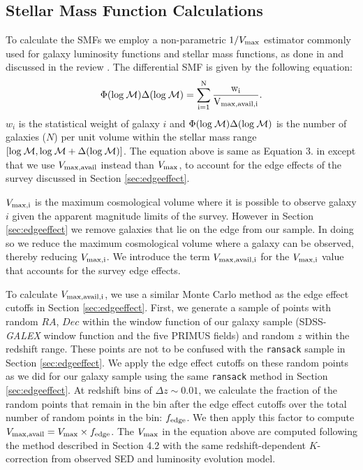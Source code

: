 \documentclass{emulateapj}
\begin{document}
\subsection{Stellar Mass Function Calculations} \label{sec:smfcalc} 
To calculate the SMFs we employ a non-parametric $1/{V_{\rm{max}}}$ estimator commonly used for galaxy luminosity functions and stellar mass functions, as done in \cite{Moustakas:2013aa} and discussed in the review \cite{Johnston:2011aa}. The differential SMF is given by the following equation:
\begin{equation} \label{eq:phi}
\Phi(\rm{log}\: \mathcal{M}) \Delta(\rm{log} \:\mathcal{M}) = \sum\limits_{i=1}^{N} \frac{w_i}{V_{\rm{max,avail},i}}. 
\end{equation}
$w_i$ is the statistical weight of galaxy $i$ and $\Phi(\rm{log}\: \mathcal{M}) \Delta(\rm{log}\: \mathcal{M})$ is the number of galaxies ($N$) per unit volume within the stellar mass range $[\rm{log} \:\mathcal{M}, \rm{log} \:\mathcal{M}+\Delta(\rm{log} \:\mathcal{M})]$. The equation above is same as Equation 3. in \cite{Moustakas:2013aa} except that we use $V_{\rm{max,avail}}$ instead than $V_{\rm{max}}$, to account for the edge effects of the survey discussed in Section \ref{sec:edgeeffect}. 

$V_{\rm{max},i}$ is the maximum cosmological volume where it is possible to observe galaxy $i$ given the apparent magnitude limits of the survey. However in Section \ref{sec:edgeeffect} we remove galaxies that lie on the edge from our sample. In doing so we reduce the maximum cosmological volume where a galaxy can be observed, thereby reducing $V_{\rm{max},i}$. We introduce the term $V_{\rm{max,avail},i}$ for the $V_{\rm{max},i}$ value that accounts for the survey edge effects. 

To calculate $V_{\rm{max,avail},i}$, we use a similar Monte Carlo method as the edge effect cutoffs in Section \ref{sec:edgeeffect}. First, we generate a sample of points with random $RA$, $Dec$ within the window function of our galaxy sample (SDSS-{\em GALEX} window function and the five PRIMUS fields) and random $z$ within the redshift range. These points are not to be confused with the \texttt{ransack} sample in Section \ref{sec:edgeeffect}. We apply the edge effect cutoffs on these random points as we did for our galaxy sample using the same \texttt{ransack} method in Section \ref{sec:edgeeffect}. At redshift bins of $\Delta z \sim 0.01$, we calculate the fraction of the random points that remain in the bin after the edge effect cutoffs over the total number of random points in the bin: $f_{\rm{edge}}$. We then apply this factor to compute $V_{\rm{max,avail}} = V_{\rm{max}} \times f_{\rm{edge}}$. The $V_{\rm{max}}$ in the equation above are computed following the method described in \cite{Moustakas:2013aa} Section 4.2 with the same redshift-dependent $K$-correction from observed SED and luminosity evolution model.
\end{document}
